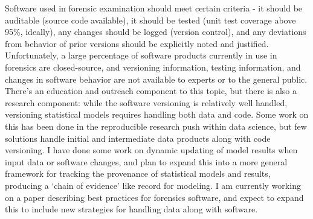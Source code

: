 \documentclass[12pt, letterpaper, sans]{moderncv}
\begin{document}
Software used in forensic examination should meet certain criteria - it should be auditable (source code available), it should be tested (unit test coverage above 95\%, ideally), any changes should be logged (version control), and any deviations from behavior of prior versions should be explicitly noted and justified. Unfortunately, a large percentage of software products currently in use in forensics are closed-source, and versioning information, testing information, and changes in software behavior are not available to experts or to the general public. There's an education and outreach component to this topic, but there is also a research component: while the software versioning is relatively well handled, versioning statistical models requires handling both data and code. Some work on this has been done in the reproducible research push within data science, but few solutions handle initial and intermediate data products along with code versioning. I have done some work on dynamic updating of model results when input data or software changes, and plan to expand this into a more general framework for tracking the provenance of statistical models and results, producing a `chain of evidence' like record for modeling. I am currently working on a paper describing best practices for forensics software, and expect to expand this to include new strategies for handling data along with software. 
\end{document}
